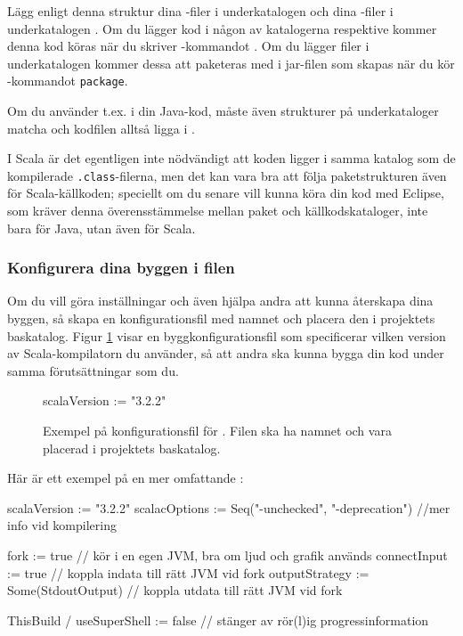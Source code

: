 \noindent Lägg enligt denna struktur dina -filer i underkatalogen  och dina -filer i underkatalogen . Om du lägger kod i någon av katalogerna  respektive  kommer denna kod köras när du skriver \sbt-kommandot . Om du lägger filer i underkatalogen  kommer dessa att paketeras med i jar-filen som skapas när du kör \sbt-kommandot \texttt{package}.

Om du använder t.ex.  i din Java-kod, måste även strukturer på underkataloger matcha och kodfilen alltså ligga i  .

I Scala är det egentligen inte nödvändigt att koden ligger i samma katalog som de kompilerade \texttt{.class}-filerna, men det kan vara bra att följa paketstrukturen även för Scala-källkoden; speciellt om du senare vill kunna köra din kod med Eclipse, som kräver denna överensstämmelse mellan paket och källkodskataloger, inte bara för Java, utan även för Scala.

\subsubsection{Konfigurera dina byggen i filen }

Om du vill göra inställningar och även hjälpa andra att kunna återskapa dina byggen, så skapa en konfigurationsfil med namnet  och placera den i projektets baskatalog. Figur \ref{fig:sbt:build-file} visar en byggkonfigurationsfil som specificerar vilken version av Scala-kompilatorn du använder, så att andra ska kunna bygga din kod under samma förutsättningar som du.

\begin{figure}[H]
\centering
\begin{Code}
scalaVersion := "3.2.2"
\end{Code}
\caption{Exempel på konfigurationsfil för \sbt. Filen ska ha namnet  och vara placerad i projektets baskatalog.}
\label{fig:sbt:build-file}
\end{figure}

\noindent Här är ett exempel på en mer omfattande :
\begin{CodeSmall}
scalaVersion   := "3.2.2"
scalacOptions  := Seq("-unchecked", "-deprecation") //mer info vid kompilering

fork           := true   // kör i en egen JVM, bra om ljud och grafik används 
connectInput   := true   // koppla indata till rätt JVM vid fork
outputStrategy := Some(StdoutOutput)  // koppla utdata till rätt JVM vid fork

ThisBuild / useSuperShell := false // stänger av rör(l)ig progressinformation
\end{CodeSmall}

